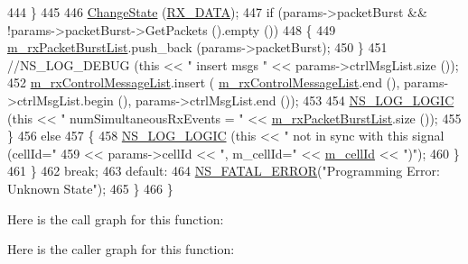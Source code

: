 \begin{DoxyCode}
444                         \}
445 
446                         \hyperlink{classns3_1_1MmWaveSpectrumPhy_a9cd75564fa85ffcb96771d0f5451d3e5}{ChangeState} (\hyperlink{classns3_1_1MmWaveSpectrumPhy_a665335f60416cf031a9b68209e4368aea5283250c41727eee6b26940406b690d9}{RX\_DATA});
447                         \textcolor{keywordflow}{if} (params->packetBurst && !params->packetBurst->GetPackets ().empty ())
448                         \{
449                                 \hyperlink{classns3_1_1MmWaveSpectrumPhy_ab57ce6deb73d1e7032276863528fa320}{m\_rxPacketBurstList}.push\_back (params->packetBurst);
450                         \}
451                         \textcolor{comment}{//NS\_LOG\_DEBUG (this << " insert msgs " << params->ctrlMsgList.size ());}
452                         \hyperlink{classns3_1_1MmWaveSpectrumPhy_a664d37bae64e42733ffbc3b225104ebd}{m\_rxControlMessageList}.insert (
      \hyperlink{classns3_1_1MmWaveSpectrumPhy_a664d37bae64e42733ffbc3b225104ebd}{m\_rxControlMessageList}.end (), params->ctrlMsgList.begin (), params->ctrlMsgList.end 
      ());
453 
454                         \hyperlink{group__logging_ga88acd260151caf2db9c0fc84997f45ce}{NS\_LOG\_LOGIC} (\textcolor{keyword}{this} << \textcolor{stringliteral}{" numSimultaneousRxEvents = "} << 
      \hyperlink{classns3_1_1MmWaveSpectrumPhy_ab57ce6deb73d1e7032276863528fa320}{m\_rxPacketBurstList}.size ());
455                 \}
456                 \textcolor{keywordflow}{else}
457                 \{
458                         \hyperlink{group__logging_ga88acd260151caf2db9c0fc84997f45ce}{NS\_LOG\_LOGIC} (\textcolor{keyword}{this} << \textcolor{stringliteral}{" not in sync with this signal (cellId="}
459                                       << params->cellId  << \textcolor{stringliteral}{", m\_cellId="} << 
      \hyperlink{classns3_1_1MmWaveSpectrumPhy_ac47302ef0f8154064d84adcc0001d77c}{m\_cellId} << \textcolor{stringliteral}{")"});
460                 \}
461         \}
462         \textcolor{keywordflow}{break};
463         \textcolor{keywordflow}{default}:
464                 \hyperlink{group__fatal_ga5131d5e3f75d7d4cbfd706ac456fdc85}{NS\_FATAL\_ERROR}(\textcolor{stringliteral}{"Programming Error: Unknown State"});
465         \}
466 \}
\end{DoxyCode}


Here is the call graph for this function\+:




Here is the caller graph for this function\+:


